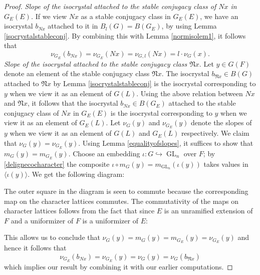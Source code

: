 \documentclass[11pt,a4paper]{article}
\theoremstyle{definition}
\theoremstyle{plain}
\theoremstyle{remark}
\theoremstyle{plain}
\DeclareMathOperator{\GL}{GL}
\DeclareMathOperator{\val}{val}
\begin{document}
\begin{proof}
    \textit{Slope of the isocrystal attached to the stable conjugacy class of $Nx$ in $G_E(E)$.} If we view $Nx$ as a stable conjugacy class in $G_E(E)$, we have an isocrystal $b_{Nx}$ attached to it in $B_l(G) = B(G_E)$, by using Lemma \ref{isocrystalstableconj}. By combining this with Lemma \ref{normisolem1}, it follows that $$\nu_{G_E}(b_{Nx}) = \nu_{G_E}(Nx) = \nu_{G,l}(Nx) = l \cdot \nu_G(x).$$
    \textit{Slope of the isocrystal attached to the stable conjugacy class $\mathfrak{N}x$}. Let $y \in G(F)$ denote an element of the stable conjugacy class $\mathfrak{N}x$. The isocrystal $b_{\mathfrak{N}x} \in B(G)$ attached to $\mathfrak{N}x$ by Lemma \ref{isocrystalstableconj} is the isocrystal corresponding to $y$ when we view it as an element of $G(L)$. Using the above relation between $Nx$ and $\mathfrak{N}x$, it follows that the isocrystal $b_{Nx} \in B(G_E)$ attached to the stable conjugacy class of $Nx$ in $G_E(E)$ is the isocrystal corresponding to $y$ when we view it as an element of $G_E(L)$. Let $\nu_G(y)$ and $\nu_{G_E}(y)$ denote the slopes of $y$ when we view it as an element of $G(L)$ and $G_E(L)$ respectively. We claim that $\nu_G(y) = \nu_{G_E}(y)$. Using Lemma \ref{equalityofslopes}, it suffices to show that $m_G(y) = m_{G_E}(y)$. Choose an embedding $\iota: G \hookrightarrow \GL_n$ over $F$; by \ref{delignecocharacter} the composite $\iota \circ m_G(y) = m_{\GL_n}(\iota(y))$ takes values in $\langle \iota(y) \rangle$. We get the following diagram:
    \begin{center}
    \end{center}
    The outer square in the diagram is seen to commute because the corresponding map on the character lattices commutes. The commutativity of the maps on character lattices follows from the fact that since $E$ is an unramified extension of $F$ and a uniformizer of $F$ is a uniformizer of $E$:
    \begin{center}
    \end{center}
    This allows us to conclude that $\nu_G(y) = m_G(y) = m_{G_E}(y) = \nu_{G_E}(y)$ and hence it follows that $$ \nu_{G_E}(b_{Nx}) = \nu_{G_E}(y) = \nu_G(y) = \nu_G(b_{\mathfrak{N}x})$$ which implies our result by combining it with our earlier computations.    
\end{proof}
\end{document}
